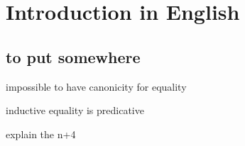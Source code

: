 \setchapterpreamble[u]{\margintoc}
\chapter{Introduction in English}

\section{to put somewhere}

impossible to have canonicity for equality

inductive equality is predicative

explain the n+4
